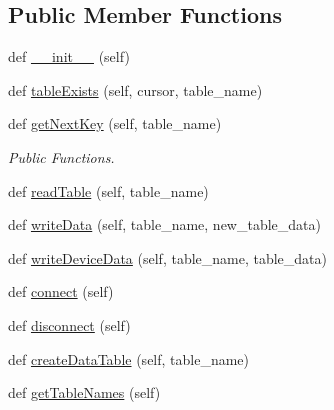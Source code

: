 \subsection*{Public Member Functions}
\begin{DoxyCompactItemize}
\item 
def \mbox{\hyperlink{classDatabaseConnector_1_1DatabaseConnect_adafc2b78cab3df24b9f1f88990f88ac7}{\+\_\+\+\_\+init\+\_\+\+\_\+}} (self)
\item 
def \mbox{\hyperlink{classDatabaseConnector_1_1DatabaseConnect_a2e58b915bdd35d819f25c110d258adc7}{table\+Exists}} (self, cursor, table\+\_\+name)
\item 
def \mbox{\hyperlink{classDatabaseConnector_1_1DatabaseConnect_a2fea409b9f5b72e8c36f0dd0a8515253}{get\+Next\+Key}} (self, table\+\_\+name)
\begin{DoxyCompactList}\small\item\em Public Functions. \end{DoxyCompactList}\item 
def \mbox{\hyperlink{classDatabaseConnector_1_1DatabaseConnect_a18f9d359811b7bdab423f052fe65e05b}{read\+Table}} (self, table\+\_\+name)
\item 
def \mbox{\hyperlink{classDatabaseConnector_1_1DatabaseConnect_a6e37300433dbbbe0406adb7d969ef2e5}{write\+Data}} (self, table\+\_\+name, new\+\_\+table\+\_\+data)
\item 
def \mbox{\hyperlink{classDatabaseConnector_1_1DatabaseConnect_af67bc1a7983d83e2df140bc3cec92d84}{write\+Device\+Data}} (self, table\+\_\+name, table\+\_\+data)
\item 
def \mbox{\hyperlink{classDatabaseConnector_1_1DatabaseConnect_a9d31fcb5c4b23c692a0488ab8633ba78}{connect}} (self)
\item 
def \mbox{\hyperlink{classDatabaseConnector_1_1DatabaseConnect_aeb9d5d3e55d60d137d938c8ba6f696b7}{disconnect}} (self)
\item 
def \mbox{\hyperlink{classDatabaseConnector_1_1DatabaseConnect_afd3c4da0bc49a45cf43f243bca6fe7f6}{create\+Data\+Table}} (self, table\+\_\+name)
\item 
def \mbox{\hyperlink{classDatabaseConnector_1_1DatabaseConnect_a2ea501b906d72bac48ea7bc92ae87044}{get\+Table\+Names}} (self)
\end{DoxyCompactItemize}
